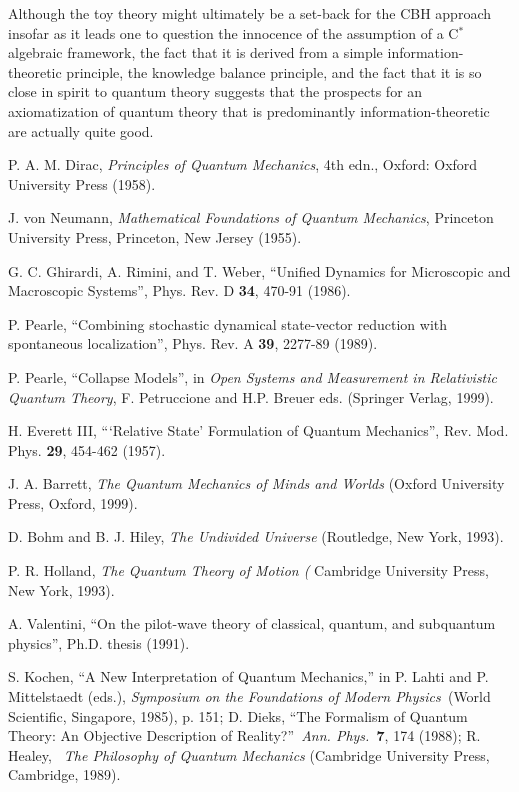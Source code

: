 \documentclass[pra,nofootinbib,showpacs,12pt]{revtex4}
\begin{document}
Although the toy theory might ultimately be a set-back for the CBH approach
insofar as it leads one to question the innocence of the assumption of a C$%
^{*}$ algebraic framework, the fact that it is derived from a simple
information-theoretic principle, the knowledge balance principle, and the
fact that it is so close in spirit to quantum theory suggests that the
prospects for an axiomatization of quantum theory that is predominantly
information-theoretic are actually quite good.

\begin{thebibliography}{99}
 P. A. M. Dirac, \textit{Principles of Quantum Mechanics},
4th edn., Oxford: Oxford University Press (1958).

 J. von Neumann, \textit{Mathematical Foundations of
Quantum Mechanics}, Princeton University Press, Princeton, New Jersey (1955).

 G. C. Ghirardi, A. Rimini, and T. Weber, ``Unified Dynamics
for Microscopic and Macroscopic Systems'', Phys. Rev. D \textbf{34}, 470-91
(1986).

 P. Pearle, ``Combining stochastic dynamical state-vector
reduction with spontaneous localization'', Phys. Rev. A \textbf{39}, 2277-89
(1989).

 P. Pearle, ``Collapse Models'', in \textit{Open Systems and
Measurement in Relativistic Quantum Theory}, F. Petruccione and H.P. Breuer
eds. (Springer Verlag, 1999).

 H. Everett III, ```Relative State' Formulation of Quantum
Mechanics'', Rev. Mod. Phys. \textbf{29}, 454-462 (1957).

 J. A. Barrett, \textit{The Quantum Mechanics of Minds and
Worlds} (Oxford University Press, Oxford, 1999).

 D. Bohm and B. J. Hiley, \textit{The Undivided Universe}
(Routledge, New York, 1993).

 P. R. Holland, \textit{The Quantum Theory of Motion (}%
Cambridge University Press, New York, 1993).

 A. Valentini, ``On the pilot-wave theory of classical,
quantum, and subquantum physics'', Ph.D. thesis (1991).

 S. Kochen, ``A New Interpretation of Quantum Mechanics,'' in
P. Lahti and P. Mittelstaedt (eds.), \textit{Symposium on the Foundations of
Modern Physics}\emph{\ }(World Scientific, Singapore, 1985), p. 151; D.
Dieks, ``The Formalism of Quantum Theory: An Objective Description of
Reality?''\textit{\ Ann. Phys.}\emph{\ }\textbf{7}, 174 (1988); R. Healey,%
\textit{\ The Philosophy of Quantum Mechanics }(Cambridge University Press,
Cambridge, 1989).


\end{thebibliography}
\end{document}
